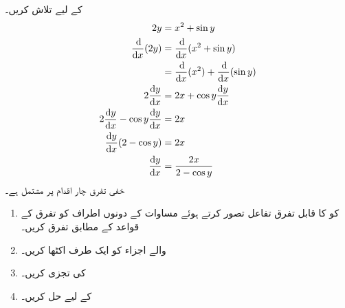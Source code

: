  کے لیے  تلاش کریں۔\\
\begin{align*}
2y&=x^2+\sin y\\
\frac{\dif}{\dif x}(2y)&=\frac{\dif}{\dif x}(x^2+\sin y)\\
&=\frac{\dif}{\dif x}(x^2)+\frac{\dif}{\dif x}(\sin y)\\
2\frac{\dif y}{\dif x}&=2x+\cos y\frac{\dif y}{\dif x}\\
2\frac{\dif y}{\dif x}-\cos y \frac{\dif y}{\dif x}&=2x\\
\frac{\dif y}{\dif x}(2-\cos y)&=2x\\
\frac{\dif y}{\dif x}&=\frac{2x}{2-\cos y}
\end{align*}
خفی تفرق چار اقدام پر مشتمل ہے۔
\begin{enumerate}[1.]

\item
{} کو  کا قابل تفرق تفاعل تصور کرتے ہوئے مساوات کے دونوں اطراف کو تفرق کے قواعد کے مطابق تفرق کریں۔
\item
{} والے اجزاء کو ایک طرف اکٹھا کریں۔\\
\item
{} کی تجزی کریں۔\\
\item
{} کے لیے حل کریں۔
\end{enumerate}

